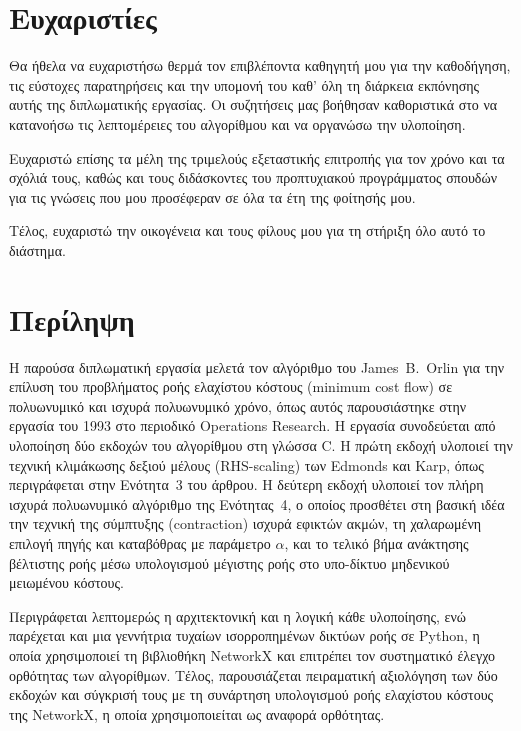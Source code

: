 \documentclass[11pt,a4paper,oneside]{report}
\renewcommand{\headrulewidth}{0pt}
\renewcommand{\footrulewidth}{0pt}
\newcommand{\setfrontmatterfooter}{%
  \fancyhf{}%
  \renewcommand{\footrulewidth}{0pt}%
  \fancyfoot[C]{-- \thepage\ --}%
  \fancypagestyle{plain}{\fancyhf{}\renewcommand{\headrulewidth}{0pt}\renewcommand{\footrulewidth}{0pt}\fancyfoot[C]{-- \thepage\ --}}%
}
\begin{document}
\setfrontmatterfooter

\chapter*{Ευχαριστίες}

Θα ήθελα να ευχαριστήσω θερμά τον επιβλέποντα καθηγητή μου για την καθοδήγηση, τις εύστοχες παρατηρήσεις και την υπομονή του καθ' όλη τη διάρκεια εκπόνησης αυτής της διπλωματικής εργασίας. Οι συζητήσεις μας βοήθησαν καθοριστικά στο να κατανοήσω τις λεπτομέρειες του αλγορίθμου και να οργανώσω την υλοποίηση.

Ευχαριστώ επίσης τα μέλη της τριμελούς εξεταστικής επιτροπής για τον χρόνο και τα σχόλιά τους, καθώς και τους διδάσκοντες του προπτυχιακού προγράμματος σπουδών για τις γνώσεις που μου προσέφεραν σε όλα τα έτη της φοίτησής μου.

Τέλος, ευχαριστώ την οικογένεια και τους φίλους μου για τη στήριξη όλο αυτό το διάστημα.

\chapter*{Περίληψη}

Η παρούσα διπλωματική εργασία μελετά τον αλγόριθμο του \textenglish{James~B.~Orlin} για την επίλυση του προβλήματος ροής ελαχίστου κόστους (\textenglish{minimum cost flow}) σε πολυωνυμικό και ισχυρά πολυωνυμικό χρόνο, όπως αυτός παρουσιάστηκε στην εργασία του 1993 στο περιοδικό \textenglish{Operations Research}. Η εργασία συνοδεύεται από υλοποίηση δύο εκδοχών του αλγορίθμου στη γλώσσα \textenglish{C}. Η πρώτη εκδοχή υλοποιεί την τεχνική κλιμάκωσης δεξιού μέλους (\textenglish{RHS-scaling}) των \textenglish{Edmonds} και \textenglish{Karp}, όπως περιγράφεται στην Ενότητα~3 του άρθρου. Η δεύτερη εκδοχή υλοποιεί τον πλήρη ισχυρά πολυωνυμικό αλγόριθμο της Ενότητας~4, ο οποίος προσθέτει στη βασική ιδέα την τεχνική της σύμπτυξης (\textenglish{contraction}) ισχυρά εφικτών ακμών, τη χαλαρωμένη επιλογή πηγής και καταβόθρας με παράμετρο $\alpha$, και το τελικό βήμα ανάκτησης βέλτιστης ροής μέσω υπολογισμού μέγιστης ροής στο υπο-δίκτυο μηδενικού μειωμένου κόστους.

Περιγράφεται λεπτομερώς η αρχιτεκτονική και η λογική κάθε υλοποίησης, ενώ παρέχεται και μια γεννήτρια τυχαίων ισορροπημένων δικτύων ροής σε \textenglish{Python}, η οποία χρησιμοποιεί τη βιβλιοθήκη \textenglish{NetworkX} και επιτρέπει τον συστηματικό έλεγχο ορθότητας των αλγορίθμων. Τέλος, παρουσιάζεται πειραματική αξιολόγηση των δύο εκδοχών και σύγκρισή τους με τη συνάρτηση υπολογισμού ροής ελαχίστου κόστους της \textenglish{NetworkX}, η οποία χρησιμοποιείται ως αναφορά ορθότητας.
\end{document}

